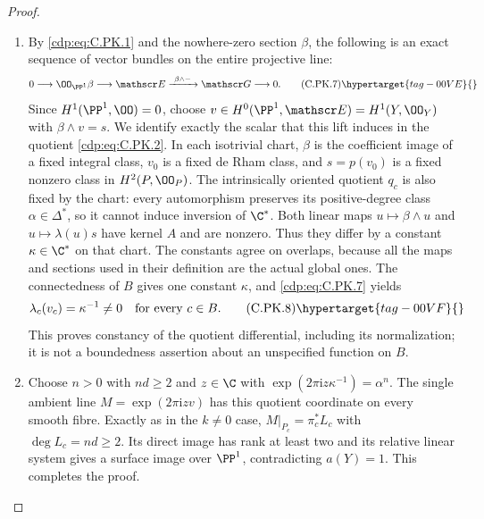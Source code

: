 \begin{proof}
\begin{enumerate}[label={$\langle1\rangle$\arabic*.},leftmargin=*]
\item By \eqref{cdp:eq:C.PK.1} and the nowhere-zero section $\beta$, the
following is an exact sequence of vector bundles on the
entire projective line:
\[
 0\longrightarrow\OO_{\PP^1}\beta
  \longrightarrow\mathscr E
  \xrightarrow{\ \beta\wedge-\ }\mathscr G
  \longrightarrow0.
\tag{C.PK.7}\hypertarget{tag-00VE}{}\label{cdp:eq:C.PK.7}
\]
Since $H^1(\PP^1,\OO)=0$, choose
$v\in H^0(\PP^1,\mathscr E)=H^1(Y,\OO_Y)$ with
$\beta\wedge v=s$.
We identify exactly the scalar that this lift induces in
the quotient \eqref{cdp:eq:C.PK.2}. In each isotrivial chart,
$\beta$ is the coefficient image of a fixed integral
class, $v_0$ is a fixed de Rham class, and $s=p(v_0)$
is a fixed nonzero class in $H^2(P,\OO_P)$.
The intrinsically oriented quotient $q_c$ is also fixed
by the chart: every automorphism preserves its
positive-degree class $\alpha\in\Delta^*$, so it cannot
induce inversion of $\C^*$.
Both linear maps $u\mapsto\beta\wedge u$ and
$u\mapsto\lambda(u)s$ have kernel $A$ and are nonzero.
Thus they differ by a constant $\kappa\in\C^*$ on
that chart. The constants agree on overlaps, because
all the maps and sections used in their definition are
the actual global ones. The connectedness of $B$ gives
one constant $\kappa$, and \eqref{cdp:eq:C.PK.7} yields
\[
 \lambda_c(v_c)=\kappa^{-1}\ne0
 \quad\hbox{for every }c\in B.
\tag{C.PK.8}\hypertarget{tag-00VF}{}\label{cdp:eq:C.PK.8}
\]
This proves constancy of the quotient differential,
including its normalization; it is not a boundedness
assertion about an unspecified function on $B$.

\item Choose $n>0$ with $nd\ge2$ and $z\in\C$ with
$\exp(2\pi\mathrm i z\kappa^{-1})=\alpha^n$.
The single ambient line $M=\exp(2\pi\mathrm i z v)$
has this quotient coordinate on every smooth fibre.
Exactly as in the $k\ne0$ case,
$M|_{P_c}=\pi_c^*L_c$ with $\deg L_c=nd\ge2$.
Its direct image has rank at least two and its relative
linear system gives a surface image over $\PP^1$,
contradicting $a(Y)=1$. This completes the proof.

\end{enumerate}
\end{proof}
